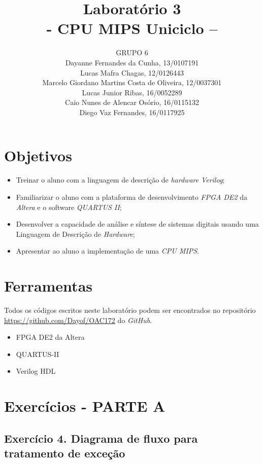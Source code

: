 \documentclass[12pt]{article}
\title{Laboratório 3\\- CPU MIPS Uniciclo –}
\author{GRUPO 6\\
	Dayanne Fernandes da Cunha, 13/0107191\\
	Lucas Mafra Chagas, 12/0126443\\
	Marcelo Giordano Martins Costa de Oliveira, 12/0037301\\
	Lucas Junior Ribas, 16/0052289\\
	Caio Nunes de Alencar Osório, 16/0115132\\
	Diego Vaz Fernandes, 16/0117925}
\begin{document}
\maketitle

\section{Objetivos}
\label{sec:Objetivos}

\begin{itemize}
\item Treinar o aluno com a linguagem de descrição de \textit{hardware} \textit{Verilog};
\item Familiarizar o aluno com a plataforma de desenvolvimento \textit{FPGA DE2} da \textit{Altera} e o software \textit{QUARTUS II};
\item Desenvolver a capacidade de análise e síntese de sistemas digitais usando uma Linguagem de Descrição de \textit{Hardware};
\item Apresentar ao aluno a implementação de uma \textit{CPU MIPS}.
\end{itemize}

\section{Ferramentas}
\label{sec:Materiais}

Todos os códigos escritos neste laboratório podem ser encontrados no repositório \url{https://github.com/Dayof/OAC172} do \textit{GitHub}.

\begin{itemize}
\item FPGA DE2 da Altera 
\item QUARTUS-II
\item Verilog HDL
\end{itemize}

\section{Exercícios - PARTE A}
\label{sec:exerciciosA}

\subsection{Exercício 4. Diagrama de fluxo para tratamento de exceção}
\label{subsec:dfluxoexc}

\end{document}
